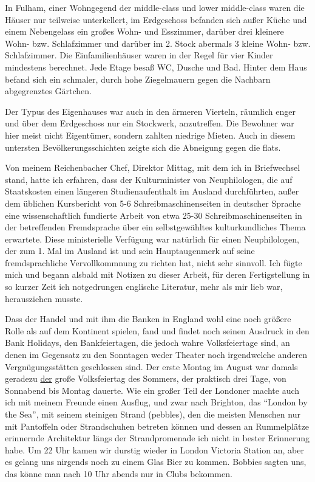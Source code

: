 \documentclass[a5paper,pagesize,10pt,twoside=true]{scrbook}
\renewcommand{\marginpar}[2][]{}
\begin{document}
In Fulham, einer Wohngegend der middle-class und lower middle-class waren die Häuser nur teilweise unterkellert, im Erdgeschoss befanden sich außer Küche und einem Nebengelass ein großes Wohn- und Esszimmer, darüber drei kleinere Wohn- bzw. Schlafzimmer und darüber im 2. Stock abermals 3 kleine Wohn- bzw. Schlafzimmer. Die Einfamilienhäuser waren in der Regel für vier Kinder mindestens berechnet. Jede Etage besaß WC, Dusche und Bad. Hinter dem Haus befand sich ein schmaler, durch hohe Ziegelmauern gegen die Nachbarn abgegrenztes Gärtchen.

Der Typus des Eigenhauses war auch in den ärmeren Vierteln, räumlich enger und über dem Erdgeschoss nur ein Stockwerk, anzutreffen. Die Bewohner war hier meist nicht Eigentümer, sondern zahlten niedrige Mieten. Auch in diesem untersten Bevölkerungsschichten zeigte sich die Abneigung gegen die flats.

Von meinem Reichenbacher Chef, Direktor Mittag, mit dem ich in Briefwechsel stand, hatte ich erfahren, dass der Kulturminister von Neuphilologen, die auf Staatskosten einen längeren Studienaufenthalt im Ausland durchführten, außer dem üblichen Kursbericht von 5-6 Schreibmaschinenseiten in deutscher Sprache eine wissenschaftlich fundierte Arbeit von etwa 25-30 Schreibmaschinenseiten in der betreffenden Fremdsprache über ein selbstgewähltes kulturkundliches Thema erwartete. Diese ministerielle Verfügung war natürlich für einen Neuphilologen, der zum 1. Mal im Ausland ist und sein Hauptaugenmerk auf seine fremdsprachliche Vervollkommnung zu richten hat, nicht sehr sinnvoll. Ich fügte mich und begann alsbald mit Notizen zu dieser Arbeit, für deren Fertigstellung in so kurzer Zeit ich notgedrungen englische Literatur, mehr als mir lieb war, herausziehen musste.

\marginpar{514}
Dass der Handel und mit ihm die Banken in England wohl eine noch größere Rolle als auf dem Kontinent spielen, fand und findet noch seinen Ausdruck in den Bank Holidays, den Bankfeiertagen, die jedoch wahre Volksfeiertage sind, an denen im Gegensatz zu den Sonntagen weder Theater noch irgendwelche anderen Vergnügungsstätten geschlossen sind. Der erste Montag im August war damals geradezu \underline{der} große Volksfeiertag des Sommers, der praktisch drei Tage, von Sonnabend bis Montag dauerte. Wie ein großer Teil der Londoner machte auch ich mit meinem Freunde einen Ausflug, und zwar nach Brighton, das \enquote{London by the Sea}, mit seinem steinigen Strand (pebbles), den die meisten Menschen nur mit Pantoffeln oder Strandschuhen betreten können und dessen an Rummelplätze erinnernde Architektur längs der Strandpromenade ich nicht in bester Erinnerung habe. Um 22 Uhr kamen wir durstig wieder in London Victoria Station an, aber es gelang uns nirgends noch zu einem Glas Bier zu kommen. Bobbies sagten uns, das könne man nach 10 Uhr abends nur in Clubs bekommen.
\end{document}
